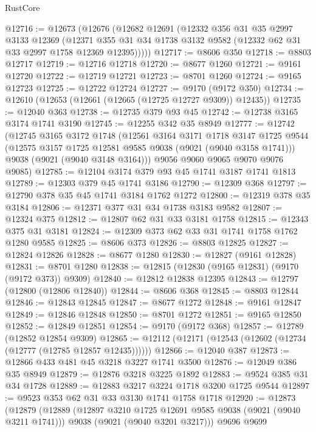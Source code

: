 \begin{lexlean}{RustCore}
\begin{coremodule}
@12716 := @12673
    (@12676
      (@12682
        @12691
        (@12332
          @356
          @31
          @35
          @2997
          @3133
          @12369
          (@12371 @355 @31 @34 @1738 @3132 @9582 (@12332 @62 @31 @33 @2997 @1758 @12369 @12395)))))
@12717 := @8606 @350
@12718 := @8803 @12717
@12719 := @12716 @12718
@12720 := @8677 @1260
@12721 := @9161 @12720
@12722 := @12719 @12721
@12723 := @8701 @1260
@12724 := @9165 @12723
@12725 := @12722 @12724
@12727 := @9170 (@9172 @350)
@12734 := @12610 (@12653 (@12661 (@12665 (@12725 @12727 @9309)) @12435))
@12735 := @12040 @363
@12738 := @12735 @379 @93 @45
@12742 := @12738 @3165 @3174 @1741 @3190
@12745 := @12255 @342 @35 @8949
@12777 := @12742
    (@12745
      @3165
      @3172
      @1748
      (@12561
        @3164
        @3171
        @1718
        @3147
        @1725
        @9544
        (@12575 @3157 @1725 @12581 @9585 @9038 (@9021 (@9040 @3158 @1741)))
        @9038
        (@9021 (@9040 @3148 @3164)))
      @9056
      @9060
      @9065
      @9070
      @9076
      @9085)
@12785 := @12104 @3174 @379 @93 @45 @1741 @3187 @1741 @1813
@12789 := @12303 @379 @45 @1741 @3186
@12790 := @12309 @368
@12797 := @12790 @378 @35 @45 @1741 @3184 @1762 @1272
@12800 := @12319 @378 @35 @3184
@12806 := @12371 @377 @31 @34 @1738 @3183 @9582
@12807 := @12324 @375
@12812 := @12807 @62 @31 @33 @3181 @1758
@12815 := @12343 @375 @31 @3181
@12824 := @12309 @373 @62 @33 @31 @1741 @1758 @1762 @1280 @9585
@12825 := @8606 @373
@12826 := @8803 @12825
@12827 := @12824 @12826
@12828 := @8677 @1280
@12830 := @12827 (@9161 @12828)
@12831 := @8701 @1280
@12838 := @12815 (@12830 (@9165 @12831) (@9170 (@9172 @373)) @9309)
@12840 := @12812 @12838 @12395
@12843 := @12797 (@12800 (@12806 @12840))
@12844 := @8606 @368
@12845 := @8803 @12844
@12846 := @12843 @12845
@12847 := @8677 @1272
@12848 := @9161 @12847
@12849 := @12846 @12848
@12850 := @8701 @1272
@12851 := @9165 @12850
@12852 := @12849 @12851
@12854 := @9170 (@9172 @368)
@12857 := @12789 (@12852 @12854 @9309)
@12865 := @12112 (@12171 (@12543 (@12602 (@12734 (@12777 (@12785 @12857 @12435))))))
@12866 := @12040 @387
@12873 := @12866 @433 @481 @45 @3218 @3227 @1741 @3500
@12876 := @12049 @386 @35 @8949
@12879 := @12876 @3218 @3225 @1892
@12883 := @9524 @385 @31 @34 @1728
@12889 := @12883 @3217 @3224 @1718 @3200 @1725 @9544
@12897 := @9523 @353 @62 @31 @33 @3130 @1741 @1758 @1718
@12920 := @12873
    (@12879
      (@12889
        (@12897 @3210 @1725 @12691 @9585 @9038 (@9021 (@9040 @3211 @1741)))
        @9038
        (@9021 (@9040 @3201 @3217)))
      @9696
      @9699

\end{coremodule}
\end{lexlean}
